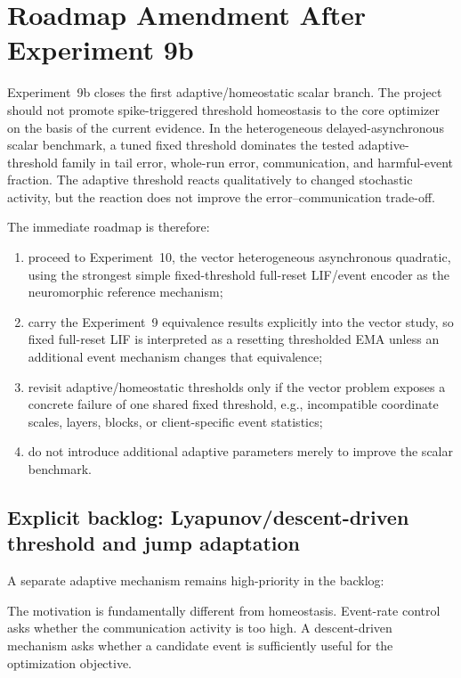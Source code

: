 \section{Roadmap Amendment After Experiment 9b}
\label{sec:roadmap-post9b}

Experiment~9b closes the first adaptive/homeostatic scalar branch. The project should not promote spike-triggered threshold homeostasis to the core optimizer on the basis of the current evidence. In the heterogeneous delayed-asynchronous scalar benchmark, a tuned fixed threshold dominates the tested adaptive-threshold family in tail error, whole-run error, communication, and harmful-event fraction. The adaptive threshold reacts qualitatively to changed stochastic activity, but the reaction does not improve the error--communication trade-off.

The immediate roadmap is therefore:
\begin{enumerate}
  \item proceed to Experiment~10, the vector heterogeneous asynchronous quadratic, using the strongest simple fixed-threshold full-reset LIF/event encoder as the neuromorphic reference mechanism;
  \item carry the Experiment~9 equivalence results explicitly into the vector study, so fixed full-reset LIF is interpreted as a resetting thresholded EMA unless an additional event mechanism changes that equivalence;
  \item revisit adaptive/homeostatic thresholds only if the vector problem exposes a concrete failure of one shared fixed threshold, e.g., incompatible coordinate scales, layers, blocks, or client-specific event statistics;
  \item do not introduce additional adaptive parameters merely to improve the scalar benchmark.
\end{enumerate}

\subsection{Explicit backlog: Lyapunov/descent-driven threshold and jump adaptation}

A separate adaptive mechanism remains high-priority in the backlog:
\begin{center}
\end{center}
The motivation is fundamentally different from homeostasis. Event-rate control asks whether the communication activity is too high. A descent-driven mechanism asks whether a candidate event is sufficiently useful for the optimization objective.

